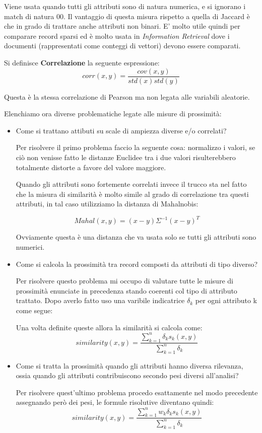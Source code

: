  Viene usata quando tutti gli attributi sono di natura numerica, e si ignorano i match di natura 00. Il vantaggio di questa misura rispetto a quella di Jaccard è che in grado di trattare anche attributi non binari. E' molto utile quindi per comparare record sparsi ed è molto usata in \textit{Information Retrieval} dove i documenti (rappresentati come conteggi di vettori) devono essere comparati.


\begin{defn}
	Si definisce \textbf{Correlazione} la seguente espressione:    \[ corr(x,y) = \frac{cov(x,y)}{std(x)std(y)}\]
\end{defn}
Questa è la stessa correlazione di Pearson ma non legata alle variabili aleatorie.

Elenchiamo ora diverse problematiche legate alle misure di prossimità:
\begin{itemize}
	\item Come si trattano attibuti su scale di ampiezza diverse e/o correlati?
	
	Per risolvere il primo problema faccio la seguente cosa: normalizzo i valori, se ciò non venisse fatto le distanze Euclidee tra i due valori risulterebbero totalmente distorte a favore del valore maggiore. 
	
	Quando gli attributi sono fortemente correlati invece il trucco sta nel fatto che la misura di similarità è molto simile al grado di correlazione tra questi attributi, in tal caso utilizziamo la distanza di Mahalnobis:
	
	\[Mahal(x,y) = (x- y)\Sigma^{-1}(x- y)^{T}\]
	
	Ovviamente questa è una distanza che va usata solo se tutti gli attributi sono numerici.
	\item Come si calcola la prossimità tra record composti da attributi di tipo diverso?
	
	 Per risolvere questo problema mi occupo di valutare tutte le misure di prossimità enunciate in precedenza stando coerenti col tipo di attributo trattato.  
	Dopo averlo fatto uso una varibile indicatrice $\delta_{k}$ per ogni attributo k come segue:
	

	Una volta definite queste allora la similarità si calcola come:
	\[similarity(x,y) = \frac{\sum_{k=1}^{n}\delta_{k}s_{k}(x,y)}{\sum_{k=1}^{n}\delta_{k}}\]
	\item Come si tratta la prossimità quando gli attributi hanno diversa rilevanza, ossia quando gli attributi contribuiscono secondo pesi diversi all'analisi? 
	
	Per risolvere quest'ultimo problema procedo esattamente nel modo precedente assegnando però dei pesi, le formule risolutive diventano quindi:
	\[similarity(x,y) = \frac{\sum_{k=1}^{n}w_{k}\delta_{k}s_{k}(x,y)}{\sum_{k=1}^{n}\delta_{k}}\]
\end{itemize}

